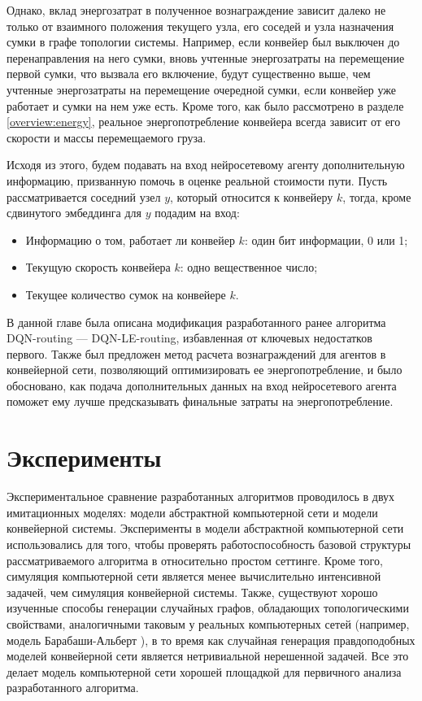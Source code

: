 \documentclass[specification,annotation,times]{itmo-student-thesis}
\theoremstyle{definition}
\begin{document}
Однако, вклад энергозатрат в полученное вознаграждение зависит далеко не только
от взаимного положения текущего узла, его соседей и узла назначения сумки в
графе топологии системы. Например, если конвейер был выключен до перенаправления
на него сумки, вновь учтенные энергозатраты на перемещение первой сумки, что
вызвала его включение, будут существенно выше, чем учтенные энергозатраты на
перемещение очередной сумки, если конвейер уже работает и сумки на нем уже есть.
Кроме того, как было рассмотрено в разделе \ref{overview:energy},
реальное энергопотребление конвейера всегда зависит от его скорости и массы
перемещаемого груза.

Исходя из этого, будем подавать на вход нейросетевому агенту дополнительную
информацию, призванную помочь в оценке реальной стоимости пути. Пусть
рассматривается соседний узел $y$, который относится к конвейеру $k$, тогда,
кроме сдвинутого эмбеддинга для $y$ подадим на вход:

\begin{itemize}
\item Информацию о том, работает ли конвейер $k$: один бит информации, 0 или 1;
\item Текущую скорость конвейера $k$: одно вещественное число;
\item Текущее количество сумок на конвейере $k$.
\end{itemize}

\chapterconclusion

В данной главе была описана модификация разработанного ранее алгоритма
DQN-routing --- DQN-LE-routing, избавленная от ключевых недостатков первого.
Также был предложен метод расчета вознаграждений для агентов в конвейерной сети,
позволяющий оптимизировать ее энергопотребление, и было обосновано, как подача
дополнительных данных на вход нейросетевого агента поможет ему лучше
предсказывать финальные затраты на энергопотребление.

\chapter{Эксперименты}\label{experiments}

Экспериментальное сравнение разработанных алгоритмов проводилось в двух
имитационных моделях: модели абстрактной компьютерной сети и модели конвейерной
системы. Эксперименты в модели абстрактной компьютерной сети использовались для
того, чтобы проверять работоспособность базовой структуры рассматриваемого
алгоритма в относительно простом сеттинге. Кроме того, симуляция компьютерной
сети является менее вычислительно интенсивной задачей, чем симуляция конвейерной
системы. Также, существуют хорошо изученные способы генерации случайных графов,
обладающих топологическими свойствами, аналогичными таковым у реальных
компьютерных сетей (например, модель Барабаши-Альберт
\cite{albert2002statistical}), в то время как случайная генерация правдоподобных
моделей конвейерной сети является нетривиальной нерешенной задачей. Все это
делает модель компьютерной сети хорошей площадкой для первичного анализа
разработанного алгоритма.
\end{document}
